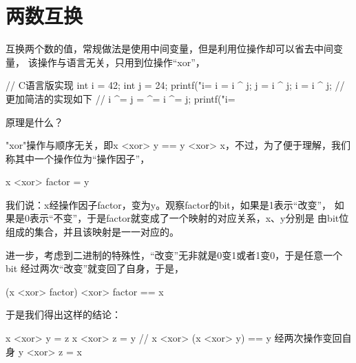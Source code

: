 \section[Swap two numbers]{两数互换}
互换两个数的值，常规做法是使用中间变量，但是利用位操作却可以省去中间变量，
该操作与语言无关，只用到位操作“xor”，

\begin{cppcode}
// C语言版实现
int i = 42;
int j = 24;
printf("i=%
i = i ^ j;
j = i ^ j;
i = i ^ j;
// 更加简洁的实现如下
// i ^= j = ^= i ^= j;
printf("i=%
\end{cppcode}

原理是什么？

"xor"操作与顺序无关，即x <xor> y == y <xor> x，不过，为了便于理解，我们
称其中一个操作位为“操作因子”，

\centerline{x <xor> factor = y}

我们说：x经操作因子factor，变为y。观察factor的bit，如果是1表示“改变”，
如果是0表示“不变”，于是factor就变成了一个映射的对应关系，x、y分别是
由bit位组成的集合，并且该映射是一一对应的。

进一步，考虑到二进制的特殊性，“改变”无非就是0变1或者1变0，于是任意一个bit
经过两次“改变”就变回了自身，于是，

\centerline{(x <xor> factor) <xor> factor == x}

于是我们得出这样的结论：

\begin{cppcode}
x <xor> y = z
x <xor> z = y // x <xor> (x <xor> y) == y 经两次操作变回自身
y <xor> z = x
\end{cppcode}